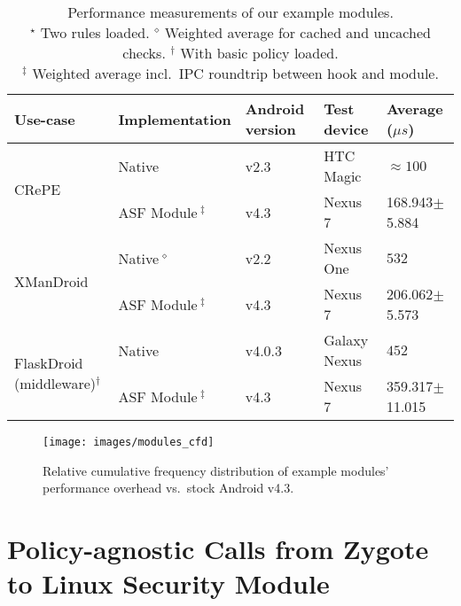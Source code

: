 \documentclass[letterpaper,twocolumn,10pt]{article}
\newcommand{\OURSHORT}{\textsc{ASF}\xspace}
\begin{document}
\begin{table*}[h]
  \centering
  \begin{tabular}{|l|l|l|l|l|}\hline
    \textbf{Use-case} & \textbf{Implementation} & \textbf{Android version} & \textbf{Test device} & \textbf{Average ($\mu s$)}\\\hline\hline
\multirow{2}{*}{CRePE~\cite{CoNgCr_10:CRePE}}${\star}$ & Native & v2.3 & HTC Magic & $\approx 100$ \\\cline{2-5}
 & \OURSHORT Module$\ ^{\ddagger}$ & v4.3 & Nexus 7 & 168.943$\pm$5.884 \\\hline\hline
\multirow{2}{*}{XManDroid~\cite{BuDaDm_12:TowardsT}} & Native$\ ^{\diamond}$ & v2.2 & Nexus One & $532$ \\\cline{2-5}
& \OURSHORT Module$\ ^{\ddagger}$ & v4.3 & Nexus 7 & 206.062$\pm$5.573\\\hline\hline
\multirow{2}{*}{FlaskDroid~\cite{TUD-CS-2013-0115} (middleware)$^{\dagger}$} & Native & v4.0.3 & Galaxy Nexus & $452$ \\\cline{2-5}
& \OURSHORT Module$\ ^{\ddagger}$ & v4.3 & Nexus 7 & 359.317$\pm$11.015 \\\hline
  \end{tabular}
\captionsetup{justification=centering,
}
  \caption{Performance measurements of our example modules.\\
    {\small\textnormal{$^\star$ Two rules loaded.}} {\small\textnormal{$^\diamond$ Weighted average for cached and uncached checks.}} {\small\textnormal {$^\dagger$ With basic policy loaded.}}\\{\small\textnormal {$^{\ddagger}$ Weighted average incl.~IPC roundtrip between hook and module.}} }
  \label{tab:moduleperf}
\end{table*}

\begin{figure*}[h]
  \centering
  \texttt{[image: images/modules\_cfd]}
  \caption{Relative cumulative frequency distribution of example modules' performance overhead vs.~stock Android v4.3.}
  \label{fig:appendix:cfdmodules}
\end{figure*}


\twocolumn

\section{Policy-agnostic Calls from Zygote to Linux Security Module}
\label{sec:appendix:kmacexample}
\end{document}
